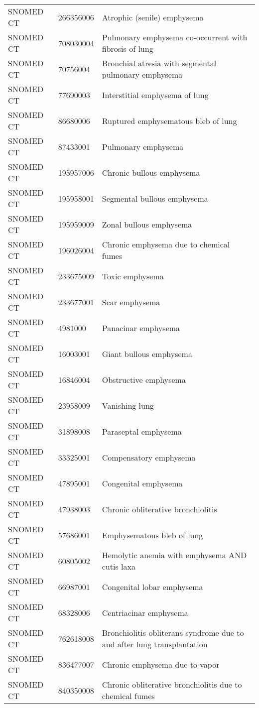 \begin{longtable}{p{}p{}p{}}
  SNOMED CT & 266356006 & Atrophic (senile) emphysema \\ 
  SNOMED CT & 708030004 & Pulmonary emphysema co-occurrent with fibrosis of lung \\ 
  SNOMED CT & 70756004 & Bronchial atresia with segmental pulmonary emphysema \\ 
  SNOMED CT & 77690003 & Interstitial emphysema of lung \\ 
  SNOMED CT & 86680006 & Ruptured emphysematous bleb of lung \\ 
  SNOMED CT & 87433001 & Pulmonary emphysema \\ 
  SNOMED CT & 195957006 & Chronic bullous emphysema \\ 
  SNOMED CT & 195958001 & Segmental bullous emphysema \\ 
  SNOMED CT & 195959009 & Zonal bullous emphysema \\ 
  SNOMED CT & 196026004 & Chronic emphysema due to chemical fumes \\ 
  SNOMED CT & 233675009 & Toxic emphysema \\ 
  SNOMED CT & 233677001 & Scar emphysema \\ 
  SNOMED CT & 4981000 & Panacinar emphysema \\ 
  SNOMED CT & 16003001 & Giant bullous emphysema \\ 
  SNOMED CT & 16846004 & Obstructive emphysema \\ 
  SNOMED CT & 23958009 & Vanishing lung \\ 
  SNOMED CT & 31898008 & Paraseptal emphysema \\ 
  SNOMED CT & 33325001 & Compensatory emphysema \\ 
  SNOMED CT & 47895001 & Congenital emphysema \\ 
  SNOMED CT & 47938003 & Chronic obliterative bronchiolitis \\ 
  SNOMED CT & 57686001 & Emphysematous bleb of lung \\ 
  SNOMED CT & 60805002 & Hemolytic anemia with emphysema AND cutis laxa \\ 
  SNOMED CT & 66987001 & Congenital lobar emphysema \\ 
  SNOMED CT & 68328006 & Centriacinar emphysema \\ 
  SNOMED CT & 762618008 & Bronchiolitis obliterans syndrome due to and after lung transplantation \\ 
  SNOMED CT & 836477007 & Chronic emphysema due to vapor \\ 
  SNOMED CT & 840350008 & Chronic obliterative bronchiolitis due to chemical fumes \\ 

\end{longtable}

